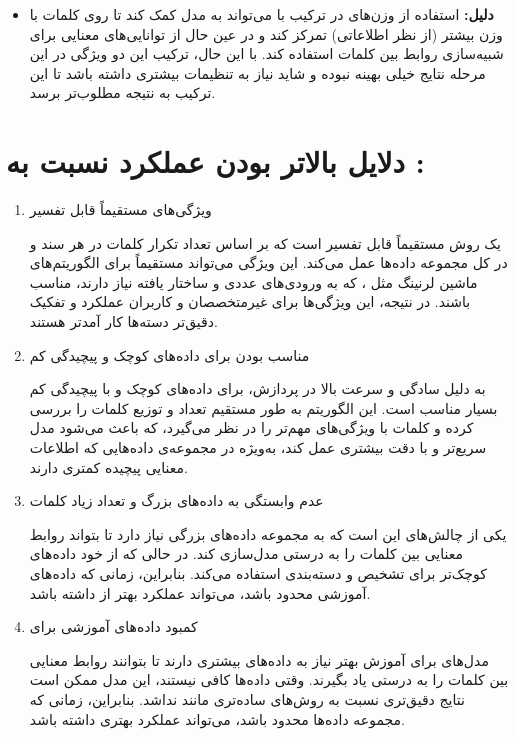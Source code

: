 \documentclass[a4paper,12pt]{article}
\begin{document}
\begin{itemize}[label=\textbullet]
	\item \textbf{دلیل:}
	استفاده از وزن‌های  در ترکیب با  می‌تواند به 
	مدل کمک کند تا روی کلمات با وزن بیشتر (از نظر اطلاعاتی) تمرکز 
	کند و در عین حال از توانایی‌های معنایی  برای شبیه‌سازی 
	روابط بین کلمات استفاده کند. با این حال، ترکیب این دو ویژگی در این 
	مرحله نتایج خیلی بهینه نبوده و شاید نیاز به تنظیمات بیشتری داشته باشد 
	تا این ترکیب به نتیجه مطلوب‌تر برسد.
\end{itemize}


\section*{دلایل بالاتر بودن عملکرد  نسبت به :}

\begin{enumerate}

\item
{ویژگی‌های مستقیماً قابل تفسیر}

 یک روش مستقیماً قابل تفسیر است که بر اساس تعداد تکرار کلمات در هر سند و در کل مجموعه داده‌ها عمل می‌کند. این ویژگی می‌تواند مستقیماً برای الگوریتم‌های ماشین لرنینگ مثل ، که به ورودی‌های عددی و ساختار یافته نیاز دارند، مناسب باشند. در نتیجه، این ویژگی‌ها برای غیرمتخصصان و کاربران عملکرد و تفکیک دقیق‌تر دسته‌ها کار آمدتر هستند.

\item 
{مناسب بودن  برای داده‌های کوچک و پیچیدگی کم}

 به دلیل سادگی و سرعت بالا در پردازش، برای داده‌های کوچک و با پیچیدگی کم بسیار مناسب است. این الگوریتم به طور مستقیم تعداد و توزیع کلمات را بررسی کرده و کلمات با ویژگی‌های مهم‌تر را در نظر می‌گیرد، که باعث می‌شود مدل سریع‌تر و با دقت بیشتری عمل کند، به‌ویژه در مجموعه‌ی داده‌هایی که اطلاعات معنایی پیچیده کمتری دارند.

\item 
{عدم وابستگی به داده‌های بزرگ و تعداد زیاد کلمات}

یکی از چالش‌های  این است که به مجموعه داده‌های بزرگی نیاز دارد تا بتواند روابط معنایی بین کلمات را به درستی مدل‌سازی کند. در حالی که  از خود داده‌های کوچک‌تر برای تشخیص و دسته‌بندی استفاده می‌کند. بنابراین، زمانی که داده‌های آموزشی محدود باشد،  می‌تواند عملکرد بهتر از  داشته باشد.

\item 
{کمبود داده‌های آموزشی برای }

مدل‌های  برای آموزش بهتر نیاز به داده‌های بیشتری دارند تا بتوانند روابط معنایی بین کلمات را به درستی یاد بگیرند. وقتی داده‌ها کافی نیستند، این مدل ممکن است نتایج دقیق‌تری نسبت به روش‌های ساده‌تری مانند  نداشد. بنابراین، زمانی که مجموعه داده‌ها محدود باشد،  می‌تواند عملکرد بهتری داشته باشد.


\end{enumerate}
\end{document}
